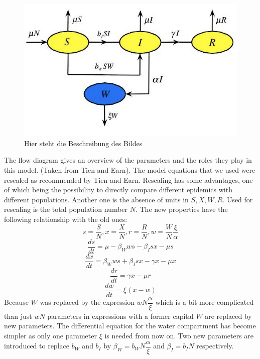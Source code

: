 \documentclass[11pt]{article}
\begin{document}
\begin{center}
\begin{figure}
\centerline{\includegraphics[scale=0.5]{Bilder/flow_diagramm_siwr_copia.png}}
\caption{Hier steht die Beschreibung des Bildes}
\end{figure}
\end{center}
The flow diagram gives an overview of the parameters and the roles they play in this model. (Taken from Tien and Earn).
The model equations that we used were rescaled as recommended by Tien and Earn. Rescaling has some advantages, one of which being the possibility to directly compare different epidemics with different populations. Another one is the absence of units in $ S, X, W, R $. Used for rescaling is the total population number $ N $. The new properties have the following relationship with the old ones: 
\begin{equation*}
s=\dfrac{S}{N} ,	  x=\dfrac{X}{N} ,	  r=\dfrac{R}{N} ,     w=\dfrac{W}{N}\dfrac{\xi}{\alpha} 
\end{equation*}
\begin{equation*}
\dfrac{ds}{dt}=\mu -\beta_{W}ws-\beta_{I}sx-\mu s
\end{equation*}
\begin{equation*}
\dfrac{dx}{dt}=\beta_{W}ws+\beta_{I}sx-\gamma x-\mu x
\end{equation*}
\begin{equation*}
\dfrac{dr}{dt}=\gamma x-\mu r
\end{equation*}
\begin{equation*}
\dfrac{dw}{dt}=\xi (x-w) 
\end{equation*}
Because $ W $ was replaced by the expression $ wN\dfrac{\alpha}{\xi} $ which is a bit more complicated than just $ wN $ parameters in expressions with a former capital $ W $ are replaced by new parameters. The differential equation for the water compartment has become simpler as only one parameter $ \xi $ is needed from now on. Two new parameters are introduced to replace $ b_{W} $ and $ b_{I} $ by $ \beta_{W}=b_{W}N\dfrac{\alpha}{\xi} $ and $ \beta_{I}=b_{I}N $ respectively.
\end{document}
